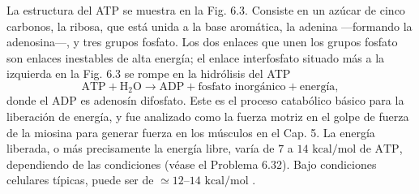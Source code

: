 \documentclass[12pt]{book}
\begin{document}
La estructura del ATP se muestra en la Fig. 6.3. Consiste en un azúcar de cinco carbonos, la ribosa, que está unida a la base aromática, la adenina ---formando la adenosina---, y tres grupos fosfato. Los dos enlaces que unen los grupos fosfato son enlaces inestables de alta energía; el enlace interfosfato situado más a la izquierda en la Fig. 6.3 se rompe en la hidrólisis del ATP
\begin{equation}
\text{ATP} + \text{H}_2\text{O} \rightarrow \text{ADP} + \text{fosfato inorgánico} + \text{energía},
\label{eq:613}
\end{equation}
donde el ADP es adenosín difosfato. Este es el proceso catabólico básico para la liberación de energía, y fue analizado como la fuerza motriz en el golpe de fuerza de la miosina para generar fuerza en los músculos en el Cap. 5. La energía liberada, o más precisamente la energía libre, varía de $7$ a $14\text{ kcal/mol de ATP}$, dependiendo de las condiciones (véase el Problema 6.32). Bajo condiciones celulares típicas, puede ser de $\simeq 12\text{--}14\text{ kcal/mol}$ \cite{55,63,75}.
\end{document}
